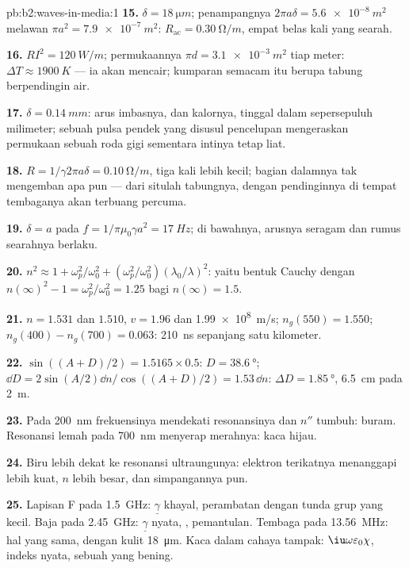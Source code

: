 \begin{solution}{pb:b2:waves-in-media:1}
\textbf{15.} $\delta = \qty{18}{\micro m}$; penampangnya $2\pi a\delta = \qty{5.6e-8}{m^2}$ melawan
$\pi a^2 = \qty{7.9e-7}{m^2}$: $R_{\text{ac}} = \qty{0.30}{\ohm/m}$, empat belas kali yang searah.

\textbf{16.} $RI^2 = \qty{120}{W/m}$; permukaannya $\pi d = \qty{3.1e-3}{m^2}$ tiap meter:
$\Delta T \approx \qty{1900}{K}$ --- ia akan mencair; kumparan semacam itu berupa tabung berpendingin air.

\textbf{17.} $\delta = \qty{0.14}{mm}$: arus imbasnya, dan kalornya, tinggal
dalam sepersepuluh milimeter; sebuah pulsa pendek yang disusul pencelupan mengeraskan
permukaan sebuah roda gigi sementara intinya tetap liat.

\textbf{18.} $R = 1/\gamma2\pi a\delta = \qty{0.10}{\ohm/m}$, tiga kali lebih kecil;
bagian dalamnya tak mengemban apa pun --- dari situlah tabungnya, dengan pendinginnya di tempat
tembaganya akan terbuang percuma.

\textbf{19.} $\delta = a$ pada $f = 1/\pi\mu_0\gamma a^2 = \qty{17}{Hz}$; di bawahnya, arusnya
seragam dan rumus searahnya berlaku.

\textbf{20.} $n^2 \approx 1 + \omega_p^2/\omega_0^2 + (\omega_p^2/\omega_0^2)(\lambda_0/\lambda)^2$: yaitu bentuk Cauchy
dengan $n(\infty)^2 - 1 = \omega_p^2/\omega_0^2 = 1.25$ bagi $n(\infty) = 1.5$.

\textbf{21.} $n = 1.531$ dan $1.510$, $v = 1.96$ dan \qty{1.99e8}{m/s}; $n_g(550) =
1.550$; $n_g(400) - n_g(700) = 0.063$: \qty{210}{ns} sepanjang satu kilometer.

\textbf{22.} $\sin((A + D)/2) = 1.5165 \times 0.5$: $D = \qty{38.6}{\degree}$; $\dd D = 2\sin
(A/2)\dd n/\cos((A + D)/2) = 1.53\,\dd n$: $\Delta D = \qty{1.85}{\degree}$, \qty{6.5}{cm} pada \qty{2}{m}.

\textbf{23.} Pada \qty{200}{nm} frekuensinya mendekati resonansinya dan
$n''$ tumbuh: buram. Resonansi lemah pada \qty{700}{nm} menyerap merahnya:
kaca hijau.

\textbf{24.} Biru lebih dekat ke resonansi ultraungunya: elektron
terikatnya menanggapi lebih kuat, $n$ lebih besar, dan simpangannya pun.

\textbf{25.} Lapisan F pada \qty{1.5}{GHz}: $\underline\gamma$ khayal, perambatan
dengan tunda grup yang kecil. Baja pada \qty{2.45}{GHz}: $\underline\gamma$ nyata, , pemantulan. Tembaga pada \qty{13.56}{MHz}: hal yang sama, dengan kulit
\qty{18}{\micro m}. Kaca dalam cahaya tampak: $\iu\omega\varepsilon_0\chi$, indeks nyata, sebuah
 yang bening.
\end{solution}
